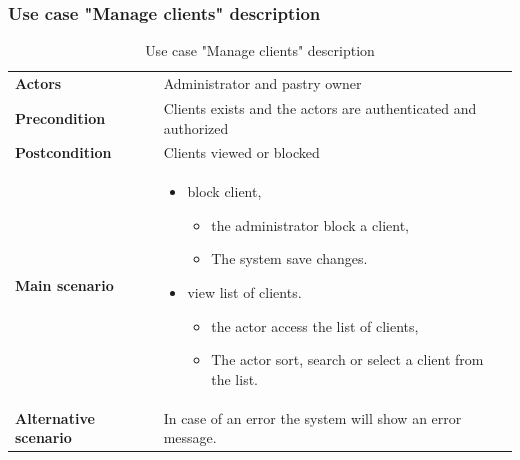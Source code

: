 \documentclass[12pt,a4paper]{report}
\begin{document}
	\subsubsection*{Use case "Manage clients" description}
	\begin{table}[H]
		\begin{center}
			\captionsetup[table]{skip=10pt}
			\caption{Use case "Manage clients" description}
			\setlength\doublerulesep{0.5pt}
			\begin{tabular}{|  p{5cm}|  p{9cm}|}
				\rowcolor{LightCyan}
				
				\hline
				\multicolumn{2}{c}{Use case "Manage clients"}\\
				\hline
				
				\textbf{Actors} &                        
				Administrator and pastry owner 
				\\ \hline
				
				\textbf{Precondition} &                        
				Clients exists and the actors are authenticated and authorized
				\\ \hline
				\textbf{Postcondition} &                        
				Clients viewed or blocked
				\\ \hline
				
				\textbf{Main scenario} &                        
				\begin{itemize}
					\item block client,
						\begin{itemize}
						\item the administrator block a client,
						\item The system save changes.
					\end{itemize}
					\item view list of clients.
				
				\begin{itemize}
					\item the actor access the list of clients,
					\item The actor sort, search or select a client from the list.
				\end{itemize}
			\end{itemize}
				\\ \hline
				
				\textbf{Alternative scenario} &                        
				In case of an error the system will show an error message.
				\\ \hline
				
				
			\end{tabular}
			
		\end{center}
		
	\end{table}
\end{document}
